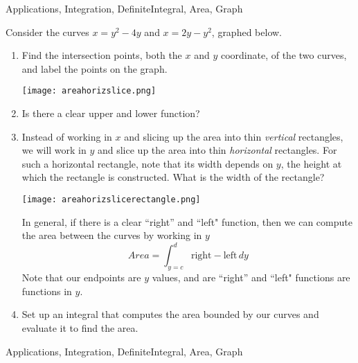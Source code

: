 \begin{tagblock}{Applications, Integration, DefiniteIntegral, Area, Graph}
\begin{question}
	


Consider the curves  $x=y^2-4y$ and $x=2y-y^2$, graphed below.  
\begin{enumerate}
\item Find the intersection points, both the $x$ and $y$ coordinate, of the two curves, and label the points on the graph.

\texttt{[image: areahorizslice.png]} 


\item Is there a clear upper and lower function?

\item Instead of working in $x$ and slicing up the area into thin \emph{vertical} rectangles, we will work in $y$ and slice up the area into thin \emph{horizontal} rectangles.  For such a horizontal rectangle, note that its width depends on $y$, the height at which the rectangle is constructed.  What is the width of the rectangle?

\texttt{[image: areahorizslicerectangle.png]} 
 
  In general, if there is a clear ``right'' and ``left" function, then we can compute the area between the curves by working in $y$
\[Area = \int_{y=c}^d \text{right} - \text{left} \, dy \]
Note that our endpoints are $y$ values, and are ``right'' and ``left" functions are functions in $y$.

\item Set up an integral that computes the area bounded by our curves and evaluate it to find the area.  

\end{enumerate}

    
\begin{tags}
       Applications, Integration, DefiniteIntegral, Area, Graph
\end{tags}
    
\begin{diary}
\end{diary}
	
\begin{solution}

\end{solution}
	
\end{question}

\end{tagblock}

